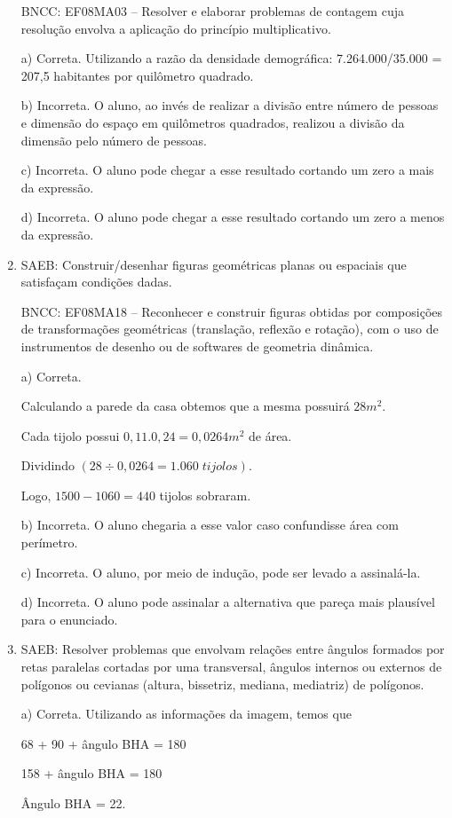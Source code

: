 \begin{enumerate}
BNCC: EF08MA03 -- Resolver e elaborar problemas de contagem cuja
resolução envolva a aplicação do princípio multiplicativo.

a) Correta. Utilizando a razão da densidade demográfica:
7.264.000/35.000 = 207,5 habitantes por quilômetro quadrado.

b) Incorreta. O aluno, ao invés de realizar a divisão entre número
de pessoas e dimensão do espaço em quilômetros quadrados, realizou a divisão da dimensão
pelo número de pessoas.

c) Incorreta. O aluno pode chegar a esse resultado cortando um
zero a mais da expressão.

d) Incorreta. O aluno pode chegar a esse resultado cortando um
zero a menos da expressão.
\item SAEB: Construir/desenhar figuras geométricas planas ou espaciais que
satisfaçam condições dadas.

BNCC: EF08MA18 -- Reconhecer e construir figuras obtidas por composições
de transformações geométricas (translação, reflexão e rotação), com o
uso de instrumentos de desenho ou de softwares de geometria dinâmica.

a) Correta. 

Calculando a parede da casa obtemos que a mesma possuirá $28m^2$.

Cada tijolo possui $0,11 . 0,24 = 0,0264m^2$ de área.

Dividindo $(28 \div 0,0264 = 1.060\; tijolos)$.

Logo, $1500 - 1060 = 440$ tijolos sobraram.

b) Incorreta. O aluno chegaria a esse valor caso confundisse área
com perímetro.

c) Incorreta. O aluno, por meio de indução, pode ser levado a
assinalá-la.

d) Incorreta. O aluno pode assinalar a alternativa que pareça mais
plausível para o enunciado.

\item SAEB: Resolver problemas que envolvam relações entre ângulos formados
por retas paralelas cortadas por uma transversal, ângulos internos ou
externos de polígonos ou cevianas (altura, bissetriz, mediana,
mediatriz) de polígonos.

a) Correta. Utilizando as informações da imagem, temos que

68 + 90 + ângulo BHA = 180

158 + ângulo BHA = 180

Ângulo BHA = 22.


\end{enumerate}
